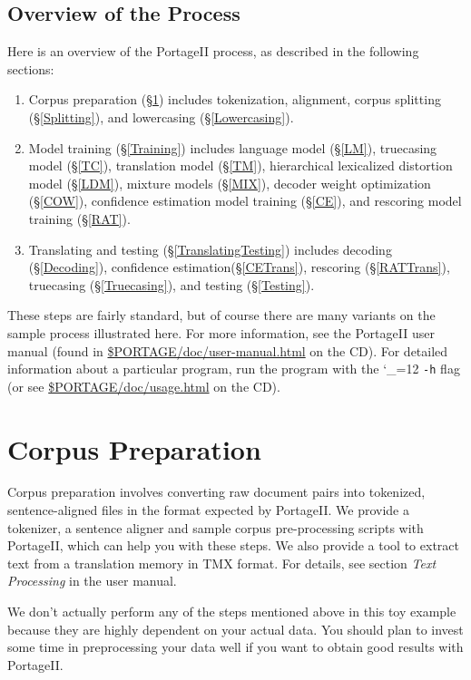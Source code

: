 \documentclass[11pt,letterpaper]{article}
\newcommand{\PS}{PortageII\xspace}
\def\code{\begingroup\catcode`\_=12 \codex}
\newcommand{\codex}[1]{\texttt{#1}\endgroup}
\begin{document}
\subsection{Overview of the Process}

Here is an overview of the \PS process, as described in the following
sections:
\begin{enumerate}
\item Corpus preparation (\S\ref{CorpusPreparation}) includes
      tokenization,
      alignment,
      corpus splitting (\S\ref{Splitting}),
      and
      lowercasing (\S\ref{Lowercasing}).
\item Model training (\S\ref{Training}) includes
      language model (\S\ref{LM}),
      truecasing model (\S\ref{TC}),
      translation model (\S\ref{TM}),
      hierarchical lexicalized distortion model (\S\ref{LDM}),
      mixture models (\S\ref{MIX}),
      decoder weight optimization (\S\ref{COW}),
      confidence estimation model training (\S\ref{CE}),
      and
      rescoring model training (\S\ref{RAT}).
\item Translating and testing (\S\ref{TranslatingTesting}) includes
      decoding (\S\ref{Decoding}),
      confidence estimation(\S\ref{CETrans}),
      rescoring (\S\ref{RATTrans}),
      truecasing (\S\ref{Truecasing}),
      and
      testing (\S\ref{Testing}).
\end{enumerate}
These steps are fairly standard, but of course there are many variants on the
sample process illustrated here. For more information, see the \PS user manual
(found in \url{$PORTAGE/doc/user-manual.html} on the CD).
For detailed information about a particular program, run the program with the
\code{-h} flag (or see \url{$PORTAGE/doc/usage.html} on the CD).  


\section{Corpus Preparation} \label{CorpusPreparation}

Corpus preparation involves converting raw document pairs into tokenized,
sentence-aligned files in the format expected by \PS.  We provide a
tokenizer, a sentence aligner and sample corpus pre-processing scripts with
\PS, which can help you with these steps.  We also provide a tool to extract
text from a translation memory in TMX format.  For details, see section
\emph{Text Processing} in the user manual.

We don't actually perform any of the steps mentioned above in this toy example
because they are highly dependent on your actual data.  You should plan to
invest some time in preprocessing your data well if you want to obtain good
results with \PS.
\end{document}
